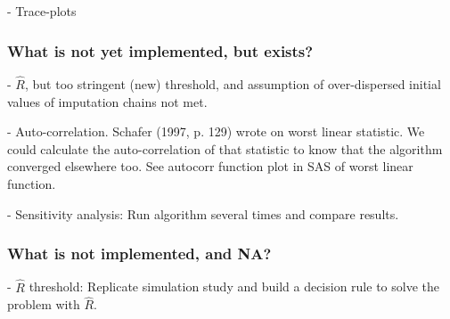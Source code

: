 \documentclass[article]{jss}
\begin{document}
- Trace-plots

\subsubsection{What is not yet implemented, but exists?}

- $\widehat{R}$, but too stringent (new) threshold, and assumption of over-dispersed initial values of imputation chains not met.

- Auto-correlation. Schafer (1997, p. 129) wrote on worst linear statistic. We could calculate the auto-correlation of that statistic to know that the algorithm converged elsewhere too. See autocorr function plot in SAS of worst linear function.

- Sensitivity analysis: Run algorithm several times and compare results. 

\subsubsection{What is not implemented, and NA?}

- $\widehat{R}$ threshold: Replicate simulation study and build a decision rule to solve the problem with $\widehat{R}$.
\end{document}
